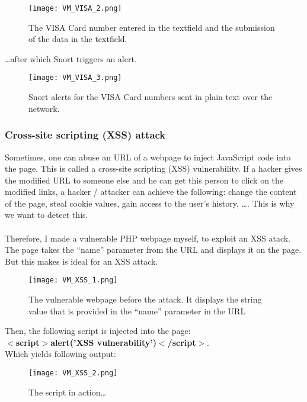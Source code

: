 \begin{figure}[h]
    \centering
    \texttt{[image: VM\_VISA\_2.png]}
    \caption{The VISA Card number entered in the textfield and the submission of the data in the textfield.}
\end{figure}

\ldots after which Snort triggers an alert.
\begin{figure}[h]
    \centering
    \texttt{[image: VM\_VISA\_3.png]}
    \caption{Snort alerts for the VISA Card numbers sent in plain text over the network.}
\end{figure}

\clearpage

\subsubsection{Cross-site scripting (XSS) attack}

Sometimes, one can abuse an URL of a webpage to inject JavaScript code into the page. This is called a cross-site scripting (XSS) vulnerability. If a hacker gives the modified URL to someone else and he can get this person to click on the modified links, a hacker / attacker can achieve the following: change the content of the page, steal cookie values, gain access to the user's history, \ldots. This is why we want to detect this. \\ \\
Therefore, I made a vulnerable PHP webpage myself, to exploit an XSS atack. The page takes the ``name'' parameter from the URL and displays it on the page. But this makes is ideal for an XSS attack.

\begin{figure}[h]
    \centering
    \texttt{[image: VM\_XSS\_1.png]}
    \caption{The vulnerable webpage before the attack. It displays the string value that is provided in the ``name'' parameter in the URL}
\end{figure}
Then, the following script is injected into the page: \\
\textbf{$<$script$>$alert('XSS vulnerability')$<$/script$>$}. \\
Which yields following output:

\begin{figure}[h]
    \centering
    \texttt{[image: VM\_XSS\_2.png]}
    \caption{The script in action\ldots}
\end{figure}

